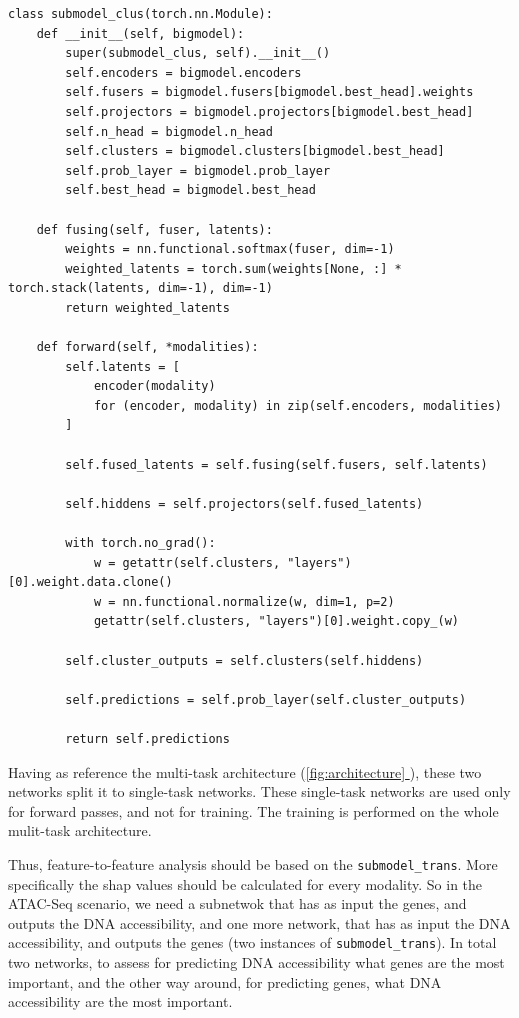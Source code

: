 \documentclass[12pt, a4paper]{article}
\newcommand*{\fullref}[1]{\hyperref[{#1}]{\ref*{#1} \nameref*{#1}}}
\begin{document}
\begin{verbatim}
class submodel_clus(torch.nn.Module):
    def __init__(self, bigmodel):
        super(submodel_clus, self).__init__()
        self.encoders = bigmodel.encoders
        self.fusers = bigmodel.fusers[bigmodel.best_head].weights
        self.projectors = bigmodel.projectors[bigmodel.best_head]
        self.n_head = bigmodel.n_head
        self.clusters = bigmodel.clusters[bigmodel.best_head]
        self.prob_layer = bigmodel.prob_layer
        self.best_head = bigmodel.best_head

    def fusing(self, fuser, latents):
        weights = nn.functional.softmax(fuser, dim=-1)
        weighted_latents = torch.sum(weights[None, :] * torch.stack(latents, dim=-1), dim=-1)
        return weighted_latents

    def forward(self, *modalities):
        self.latents = [
            encoder(modality)
            for (encoder, modality) in zip(self.encoders, modalities)
        ]

        self.fused_latents = self.fusing(self.fusers, self.latents)

        self.hiddens = self.projectors(self.fused_latents)

        with torch.no_grad():
            w = getattr(self.clusters, "layers")[0].weight.data.clone()
            w = nn.functional.normalize(w, dim=1, p=2)
            getattr(self.clusters, "layers")[0].weight.copy_(w)

        self.cluster_outputs = self.clusters(self.hiddens)

        self.predictions = self.prob_layer(self.cluster_outputs)

        return self.predictions
\end{verbatim}

Having as reference the multi-task architecture (\fullref{fig:architecture}), these two networks split it to single-task networks. These single-task networks are used only for forward passes, and not for training. The training is performed on the whole mulit-task architecture.

Thus, feature-to-feature analysis should be based on the \verb|submodel_trans|. More specifically the shap values should be calculated for every modality. So in the ATAC-Seq scenario, we need a subnetwok that has as input the genes, and outputs the DNA accessibility, and one more network, that has as input the DNA accessibility, and outputs the genes (two instances of \verb|submodel_trans|). In total two networks, to assess for predicting DNA accessibility what genes are the most important, and the other way around, for predicting genes, what DNA accessibility are the most important.
\end{document}
